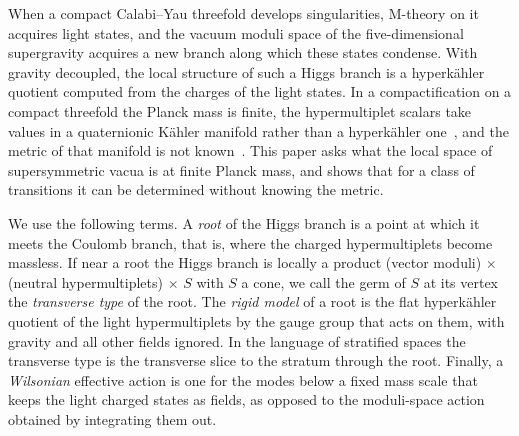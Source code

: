 When a compact Calabi--Yau threefold develops singularities, M-theory on it acquires light
states, and the vacuum moduli space of the five-dimensional supergravity acquires a new branch
along which these states condense. With gravity decoupled, the local structure of such a Higgs
branch is a hyperk\"ahler quotient computed from the charges of the light states. In a compactification on a compact threefold the Planck mass is finite, the hypermultiplet scalars take values in a
quaternionic K\"ahler manifold rather than a hyperk\"ahler one~\cite{Galicki:1988}, and the
metric of that manifold is not known~\cite{Mohaupt:2004de}. This paper asks what the local space
of supersymmetric vacua is at finite Planck mass, and shows that for a class of transitions it
can be determined without knowing the metric.

We use the following terms. A \emph{root} of the Higgs branch is a point at which it meets the
Coulomb branch, that is, where the charged hypermultiplets become massless. If near a root the
Higgs branch is locally a product (vector moduli)$\,\times\,$(neutral
hypermultiplets)$\,\times\,S$ with $S$ a cone, we call the germ of $S$ at its vertex the
\emph{transverse type} of the root. The \emph{rigid model} of a root is the flat hyperk\"ahler
quotient of the light hypermultiplets by the gauge group that acts on them, with gravity and all
other fields ignored. In the language of stratified spaces the transverse type is the transverse
slice to the stratum through the root. Finally, a \emph{Wilsonian} effective action is one for
the modes below a fixed mass scale that keeps the light charged states as fields, as opposed to
the moduli-space action obtained by integrating them out.


